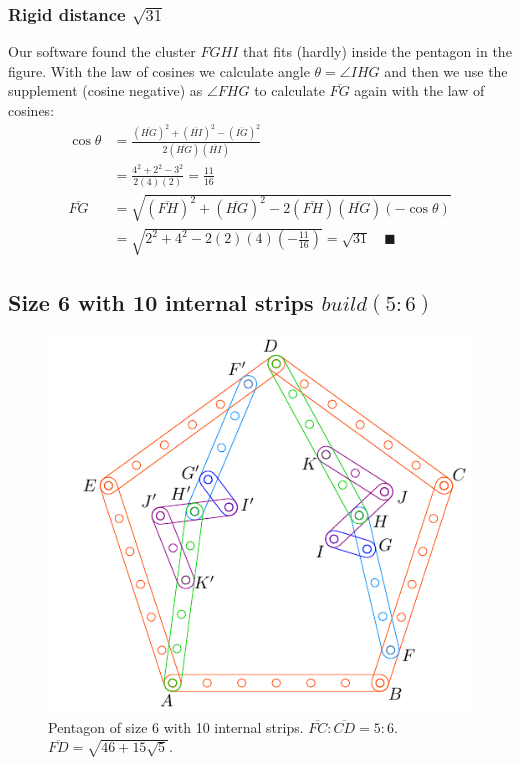 \documentclass[11pt]{article}
\begin{document}
\subsubsection{Rigid distance $\sqrt{31}$}

Our software found the cluster $FGHI$ that fits (hardly) inside the pentagon in the figure.
With the law of cosines we calculate angle $\theta = \angle{IHG}$ and then we use the supplement (cosine negative) as $\angle{FHG}$ to calculate $\overline{FG}$ again with the law of cosines:
\begin{align}
\cos\theta &= \frac{(\overline{HG})^2 + (\overline{HI})^2 - (\overline{IG})^2}
 {2(\overline{HG})(\overline{HI})} \nonumber\\
 &= \frac{4^2 + 2^2 - 3^2}{2(4)(2)} = \frac{11}{16} \\
\overline{FG} &= \sqrt{(\overline{FH})^2 + (\overline{HG})^2 
 - 2(\overline{FH})(\overline{HG})(-\cos\theta) } \nonumber\\
 &= \sqrt{2^2 + 4^2 - 2(2)(4)\left(-\frac{11}{16}\right)}
 = \sqrt{31} \quad \blacksquare
\end{align}


\subsection{Size 6 with 10 internal strips $build(5:6)$}

\begin{figure}[H]
\centering
\includegraphics[scale=1]{6/penta6-10a}
\caption{Pentagon of size 6 with 10 internal strips. $\overline{FC} : \overline{CD} = 5:6$. $\overline{FD} = \sqrt{46 + 15\sqrt5}$.}
\label{fig:penta6-10a}
\end{figure}
\end{document}
